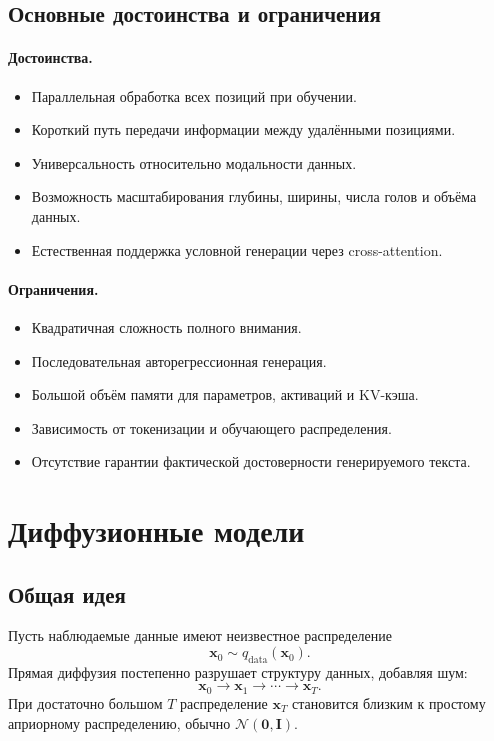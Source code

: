 \documentclass[12pt,a4paper]{article}
\theoremstyle{definition}
\newcommand{\N}{\mathcal{N}}
\newcommand{\1}{\mathbf{1}}
\begin{document}
\subsection{Основные достоинства и ограничения}

\paragraph{Достоинства.}
\begin{itemize}
    \item Параллельная обработка всех позиций при обучении.
    \item Короткий путь передачи информации между удалёнными
    позициями.
    \item Универсальность относительно модальности данных.
    \item Возможность масштабирования глубины, ширины, числа голов и
    объёма данных.
    \item Естественная поддержка условной генерации через
    cross-attention.
\end{itemize}

\paragraph{Ограничения.}
\begin{itemize}
    \item Квадратичная сложность полного внимания.
    \item Последовательная авторегрессионная генерация.
    \item Большой объём памяти для параметров, активаций и KV-кэша.
    \item Зависимость от токенизации и обучающего распределения.
    \item Отсутствие гарантии фактической достоверности генерируемого
    текста.
\end{itemize}

\section{Диффузионные модели}

\subsection{Общая идея}

Пусть наблюдаемые данные имеют неизвестное распределение
\[
    \bm{x}_0\sim q_{\text{data}}(\bm{x}_0).
\]
Прямая диффузия постепенно разрушает структуру данных, добавляя шум:
\[
    \bm{x}_0
    \longrightarrow
    \bm{x}_1
    \longrightarrow
    \cdots
    \longrightarrow
    \bm{x}_T.
\]
При достаточно большом $T$ распределение $\bm{x}_T$ становится близким
к простому априорному распределению, обычно $\N(\bm{0},\bm{I})$.
\end{document}
